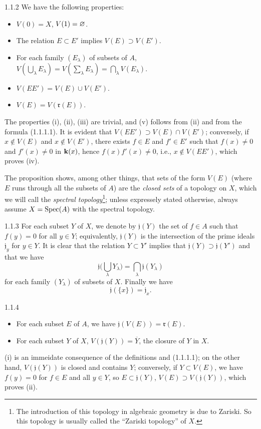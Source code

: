 \begin{env}[Proposition]{1.1.2}
\label{env-1.1.1.2}
We have the following properties:
\begin{itemize}
  \item[(i)] $V(0)=X$, $V(1)=\varnothing$.
  \item[(ii)] The relation $E\subset E'$ implies $V(E)\supset V(E')$.
  \item[(iii)] For each family $(E_\lambda)$ of subsets of $A$,
               $V(\bigcup_\lambda E_\lambda)=V(\sum_\lambda E_\lambda)=\bigcap_\lambda V(E_\lambda)$.
  \item[(iv)] $V(EE')=V(E)\cup V(E')$.
  \item[(v)] $V(E)=V(\mathfrak{r}(E))$.
\end{itemize}
\end{env}
The properties (i), (ii), (iii) are trivial, and (v) follows from (ii) and from the
formula (1.1.1.1). It is evident that $V(EE')\supset V(E)\cap V(E')$; conversely, if
$x\not\in V(E)$ and $x\not\in V(E')$, there exists $f\in E$ and $f'\in E'$ such that
$f(x)\neq 0$ and $f'(x)\neq 0$ in $\mathbf{k}(x)$, hence $f(x)f'(x)\neq 0$, i.e., $x\not\in V(EE')$,
which proves (iv).

The proposition  shows, among other things, that sets of the form $V(E)$ (where
$E$ runs through all the subsets of $A$) are the \emph{closed sets} of a topology on
$X$, which we will call the \emph{spectral topology}\footnote{The introduction of this
topology in algebraic geometry is due to Zariski. So this topology is usually called
the ``Zariski topology'' of $X$.}; unless expressely stated otherwise, always assume
$X=\operatorname{Spec}(A)$ with the spectral topology.

\begin{env}{1.1.3}
\label{env-1.1.1.3}
For each subset $Y$ of $X$, we denote by $\mathfrak{j}(Y)$ the set of $f\in A$
such that $f(y)=0$ for all $y\in Y$; equivalently, $\mathfrak{j}(Y)$ is the intersection of
the prime ideals $\mathfrak{j}_y$ for $y\in Y$. It is clear that the relation $Y\subset Y'$
implies that $\mathfrak{j}(Y)\supset\mathfrak{j}(Y')$ and that we have
\[
  \mathfrak{j}\bigg(\bigcup_\lambda Y_\lambda\bigg)=\bigcap_\lambda\mathfrak{j}(Y_\lambda)\tag{1.1.3.1}
\]
for each family $(Y_\lambda)$ of subsets of $X$. Finally we have
\[
  \mathfrak{j}(\{x\})=\mathfrak{j}_x.\tag{1.1.3.2}
\]
\end{env}

\begin{env}[Proposition]{1.1.4}
\label{prop-1.1.1.4}
\begin{itemize}
  \item[(i)] For each subset $E$ of $A$, we have $\mathfrak{j}(V(E))=\mathfrak{r}(E)$.
  \item[(ii)] For each subset $Y$ of $X$, $V(\mathfrak{j}(Y))=\overline{Y}$, the closure of $Y$ in $X$.
\end{itemize}
\end{env}
(i) is an immeidate consequence of the definitions and (1.1.1.1); on the other hand, $V(\mathfrak{j}(Y))$
is closed and contains $Y$; conversely, if $Y\subset V(E)$, we have $f(y)=0$ for $f\in E$ and all $y\in Y$,
so $E\subset\mathfrak{j}(Y)$, $V(E)\supset V(\mathfrak{j}(Y))$, which proves (ii).

